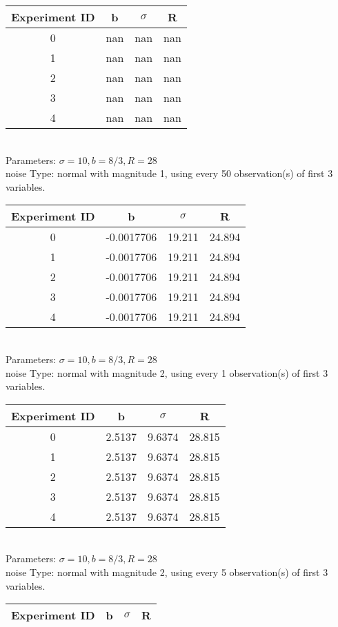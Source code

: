 \begin{multicols}{3}
\begin{tabular}{cccc}
\hline Experiment ID & b & $\sigma$ & R \\ \hline 
0 & nan & nan & nan\\ \hline 
 1 & nan & nan & nan\\ \hline 
 2 & nan & nan & nan\\ \hline 
 3 & nan & nan & nan\\ \hline 
 4 & nan & nan & nan\\ \hline 
 \end{tabular}\\
Parameters: $\sigma=10, b=8/3, R=28$\\
noise Type: normal with magnitude 1, using every 50 observation(s) of first 3 variables.\\
\begin{tabular}{cccc}
\hline Experiment ID & b & $\sigma$ & R \\ \hline 
0 & -0.0017706 & 19.211 & 24.894\\ \hline 
 1 & -0.0017706 & 19.211 & 24.894\\ \hline 
 2 & -0.0017706 & 19.211 & 24.894\\ \hline 
 3 & -0.0017706 & 19.211 & 24.894\\ \hline 
 4 & -0.0017706 & 19.211 & 24.894\\ \hline 
 \end{tabular}\\
Parameters: $\sigma=10, b=8/3, R=28$\\
noise Type: normal with magnitude 2, using every 1 observation(s) of first 3 variables.\\
\begin{tabular}{cccc}
\hline Experiment ID & b & $\sigma$ & R \\ \hline 
0 & 2.5137 & 9.6374 & 28.815\\ \hline 
 1 & 2.5137 & 9.6374 & 28.815\\ \hline 
 2 & 2.5137 & 9.6374 & 28.815\\ \hline 
 3 & 2.5137 & 9.6374 & 28.815\\ \hline 
 4 & 2.5137 & 9.6374 & 28.815\\ \hline 
 \end{tabular}\\
Parameters: $\sigma=10, b=8/3, R=28$\\
noise Type: normal with magnitude 2, using every 5 observation(s) of first 3 variables.\\
\begin{tabular}{cccc}
\hline Experiment ID & b & $\sigma$ & R \\ \hline 

\end{tabular}
\end{multicols}
